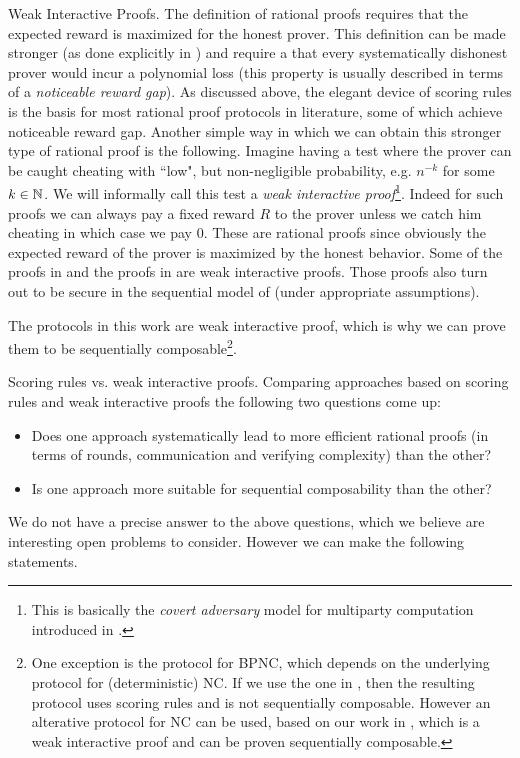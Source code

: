 \medskip
\noindent
{\sc Weak Interactive Proofs.}
The definition of rational proofs requires that the expected reward is maximized for the honest prover. This definition can be made stronger (as done explicitly in \cite{ratargs}) and require a that every systematically dishonest prover would incur a polynomial loss (this property is usually described in terms of a \textit{noticeable reward gap}). As discussed above, the elegant device of scoring rules is the basis for most rational proof protocols in literature, some of which achieve noticeable reward gap. Another simple way in which we can obtain this stronger type of rational proof is the following. Imagine having a test where the prover can be caught cheating with ``low", but non-negligible probability, e.g. $n^{-k}$ for some $k \in \mathbb{N}$.
We will informally call this test a \textit{weak interactive proof}\footnote{This is basically the {\em covert adversary} model for multiparty computation introduced in \cite{AL10}.}. Indeed for such proofs we can always pay a fixed reward $R$ to the prover unless we catch him cheating in which case we pay $0$. These are rational proofs since obviously the expected reward of the prover is maximized by the honest behavior. Some of the proofs in \cite{am} and the proofs in \cite{cg15} are weak interactive proofs. Those proofs also turn out to be secure in the sequential model of \cite{cg15} (under appropriate assumptions). 

The protocols in this work are weak interactive proof, which is why we can prove them to be sequentially composable\footnote{
	One exception is the protocol for BPNC, which depends on the underlying protocol for (deterministic) NC. If we use the one in \cite{ratsumchecks}, then the resulting protocol uses scoring rules and is not sequentially composable. However an alterative protocol for NC can be used, based on our work in \cite{cg15}, which is a weak interactive proof and can be proven sequentially composable.}.


\medskip
\noindent
{\sc Scoring rules vs. weak interactive proofs.}
Comparing approaches based on scoring rules and weak interactive proofs the following two questions come up: 
\begin{itemize}
	\item Does one approach systematically lead to more efficient rational proofs (in terms of rounds, communication and verifying complexity) than the other? 
	\item Is one approach more suitable for sequential composability than the other?
\end{itemize}
We do not have a precise answer to the above questions, which we believe are interesting open problems to consider. However we can make the following statements. 

